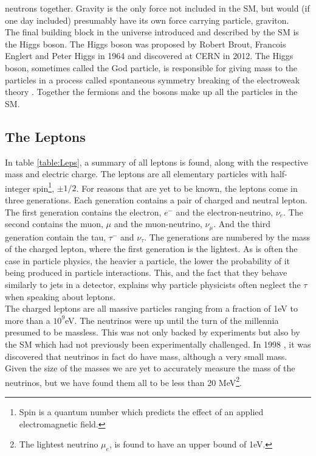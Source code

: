 neutrons together. Gravity is the only force not included in the SM, but would (if one day included)
presumably have its own force carrying particle, graviton. 
\\
The final building block in the universe introduced and described by the \ac{SM} is the Higgs boson.
The Higgs boson was proposed by Robert Brout, Francois Englert and Peter Higgs in 1964 and discovered at CERN in 2012. The Higgs boson,
sometimes called the God particle, is responsible for giving mass to the particles in a process called
spontaneous symmetry breaking of the electroweak theory \cite{SSB}. Together the fermions and the bosons make up all the 
particles in the \ac{SM}.
\subsection{The Leptons} 
In table \ref{table:Leps}, a summary of all leptons is found, along with the respective mass and electric charge.  
The leptons are all elementary particles with half-integer spin\footnote{Spin is a quantum number
which predicts the effect of an applied electromagnetic field.}, $\pm 1/2$. For reasons that are yet to be known, the 
leptons come in three generations. Each generation contains a pair of charged and neutral lepton. The first generation contains the
electron, $e^-$ and the electron-neutrino, $\nu_e$. The second contains the muon, $\mu$ and the
muon-neutrino, $\nu_\mu$. And the third generation contain the tau, $\tau^-$ and $\nu_\tau$. The generations
are numbered by the mass of the charged lepton, where the first generation is the lightest. As is often the case
in particle physics, the heavier a particle, the lower the probability of it being produced in particle interactions. 
This, and the fact that they behave similarly to jets in a detector, explains why particle physicists often neglect 
the $\tau$ when speaking about leptons.
\\
The charged leptons are all massive particles ranging from a fraction of 1eV to more than a $10^9$eV.
The neutrinos were up until the turn of the millennia presumed to be massless. This was not only backed by experiments
but also by the \ac{SM} which had not previously been experimentally challenged. In 1998 \cite{NeutrinoMass}, it was discovered 
that neutrinos in fact do have mass, although a very small mass. Given the size of the masses we are yet to accurately measure 
the mass of the neutrinos, but we have found them all to be less than 20 MeV\footnote{The lightest neutrino $\mu_e$, is found to 
have an upper bound of 1eV.}.
